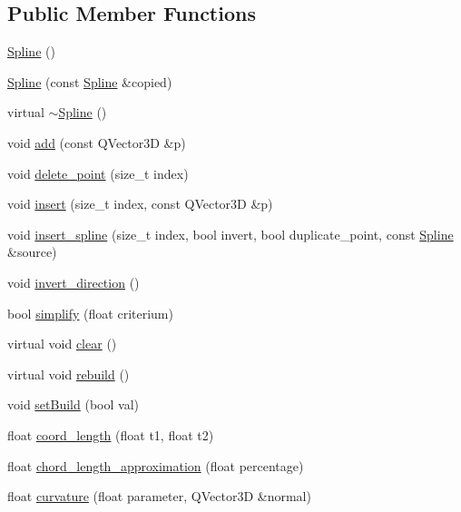 \subsection*{Public Member Functions}
\begin{DoxyCompactItemize}
\item 
\hyperlink{classShipCAD_1_1Spline_a7ad84ea604562c7c9cb309b4e78e25c5}{Spline} ()
\item 
\hyperlink{classShipCAD_1_1Spline_a891b0c893b8124dca341680076854bff}{Spline} (const \hyperlink{classShipCAD_1_1Spline}{Spline} \&copied)
\item 
virtual \hyperlink{classShipCAD_1_1Spline_a20cddb0145346150b4ca30b63ef47c9b}{$\sim$\-Spline} ()
\item 
void \hyperlink{classShipCAD_1_1Spline_ac3d9f4514573be91b316413bf062791a}{add} (const Q\-Vector3\-D \&p)
\item 
void \hyperlink{classShipCAD_1_1Spline_a120c5530571f138daad61426053220f3}{delete\-\_\-point} (size\-\_\-t index)
\item 
void \hyperlink{classShipCAD_1_1Spline_aa1ea6446e0b59d5cce88580242cd25b6}{insert} (size\-\_\-t index, const Q\-Vector3\-D \&p)
\item 
void \hyperlink{classShipCAD_1_1Spline_aa8e588b92d23c74bb6ec120624b49e54}{insert\-\_\-spline} (size\-\_\-t index, bool invert, bool duplicate\-\_\-point, const \hyperlink{classShipCAD_1_1Spline}{Spline} \&source)
\item 
void \hyperlink{classShipCAD_1_1Spline_a26293a4ee636c2b968c45731425d5c94}{invert\-\_\-direction} ()
\item 
bool \hyperlink{classShipCAD_1_1Spline_a043f418b363a0dc7161b9106a72ef8b4}{simplify} (float criterium)
\item 
virtual void \hyperlink{classShipCAD_1_1Spline_a02967f3eee8b1755eab0d7da55c3c621}{clear} ()
\item 
virtual void \hyperlink{classShipCAD_1_1Spline_a9b466ad7510032dafb0421f2d834bde6}{rebuild} ()
\item 
void \hyperlink{classShipCAD_1_1Spline_a6e932411f0f4463514f80011c58f5e6a}{set\-Build} (bool val)
\item 
float \hyperlink{classShipCAD_1_1Spline_a9d4d64a34b1511efc5c41b9e31956a3e}{coord\-\_\-length} (float t1, float t2)
\item 
float \hyperlink{classShipCAD_1_1Spline_ae15513771d88f4f545048d4204e98325}{chord\-\_\-length\-\_\-approximation} (float percentage)
\item 
float \hyperlink{classShipCAD_1_1Spline_a5681a27480f934a73462e53b2b4e2461}{curvature} (float parameter, Q\-Vector3\-D \&normal)

\end{DoxyCompactItemize}
